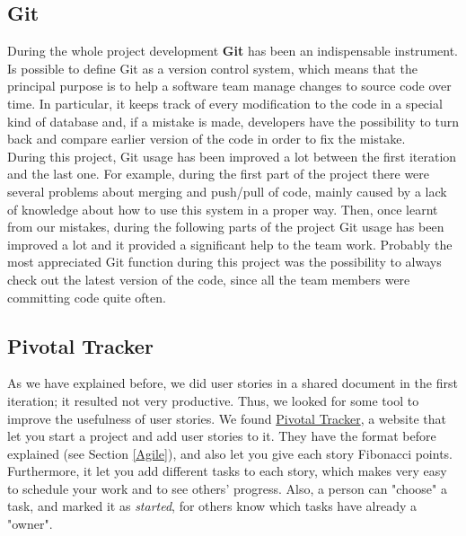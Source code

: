 	\subsection{Git}
During the whole project development \textbf{Git} has been an indispensable instrument.\\
Is possible to define Git as a version control system, which means that the principal purpose is to help a software team manage changes to source code over time. In particular, it keeps track of every modification to the code in a special kind of database and, if a mistake is made, developers have the possibility to turn back and compare earlier version of the code in order to fix the mistake.\cite{versionController}\\
During this project, Git usage has been improved a lot between the first iteration and the last one. For example, during the first part of the project there were several problems about merging and push/pull of code, mainly caused by a lack of knowledge about how to use this system in a proper way. Then, once learnt from our mistakes, during the following parts of the project Git usage has been improved a lot and it provided a significant help to the team work. Probably the most appreciated Git function during this project was the possibility to always check out the latest version of the code, since all the team members were committing code quite often.

	\subsection{Pivotal Tracker} \label{Pivotal_Tracker}
As we have explained before, we did user stories in a shared document in the first iteration; it resulted not very productive. Thus, we looked for some tool to improve the usefulness of user stories. We found \href{https://www.pivotaltracker.com/}{Pivotal Tracker}, a website that let you start a project and add user stories to it. They have the format before explained (see Section \ref{Agile}), and also let you give each story Fibonacci points. Furthermore, it let you add different tasks to each story, which makes very easy to schedule your work and to see others' progress. Also, a person can "choose" a task, and marked it as \textit{started}, for others know which tasks have already a "owner".
